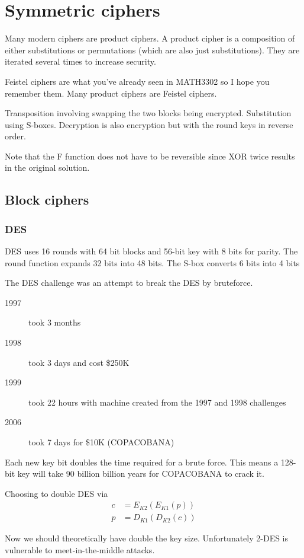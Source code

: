 \documentclass{report}
\begin{document}
\section{Symmetric ciphers}
Many modern ciphers are product ciphers.
A product cipher is a composition of either substitutions or permutations
(which are also just substitutions). They are iterated several times to increase
security.

Feistel ciphers are what you've already seen in MATH3302 so I hope you remember
them. Many product ciphers are Feistel ciphers.

Transposition involving swapping the two blocks being encrypted.
Substitution using S-boxes.
Decryption is also encryption but with the round keys in reverse order.

Note that the F function does not have to be reversible since XOR twice results
in the original solution.

\subsection{Block ciphers}
\subsubsection{DES}
DES uses 16 rounds with 64 bit blocks and 56-bit key with 8 bits for parity.
The round function expands 32 bits into 48 bits.
The S-box converts 6 bits into 4 bits

The DES challenge was an attempt to break the DES by bruteforce.
\begin{description}
    \item [1997] took 3 months
    \item [1998] took 3 days and cost \$250K
    \item [1999] took 22 hours with machine created from the 1997 and 1998 challenges
    \item [2006] took 7 days for \$10K (COPACOBANA)
\end{description}

Each new key bit doubles the time required for a brute force. This means a
128-bit key will take 90 billion billion years for COPACOBANA to crack it.

Choosing to double DES via
\begin{align*}
    c &= E_{K2}(E_{K1}(p)) \\
    p &= D_{K1}(D_{K2}(c))
\end{align*}

Now we should theoretically have double the key size. Unfortunately 2-DES is
vulnerable to meet-in-the-middle attacks.
\end{document}
